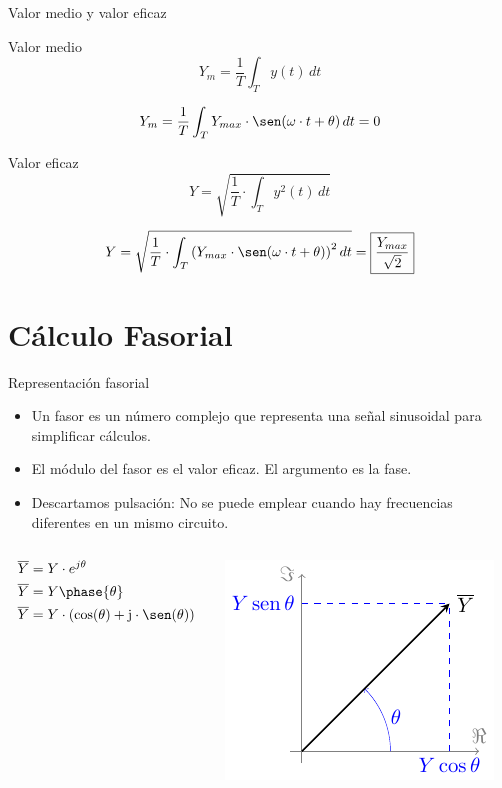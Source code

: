 \documentclass[aspectratio=169, usenames,svgnames,dvipsnames]{beamer}
\begin{document}
\begin{frame}[label={sec:orgc7bd73a}]{Valor medio y valor eficaz}
\begin{block}{Valor medio}
\[
Y_m=\frac{1}{T}\int_{T} y(t)\, dt
\]

\[
Y_m=\frac{1}{T}\int_T Y_{max}\cdot\sen(\omega \cdot t+\theta)\, dt=0
\]
\end{block}
\begin{block}{Valor eficaz}
\[
Y = \sqrt{\frac{1}{T}\cdot\int_T y^{2}(t)\, dt}
\]

\[
Y=\sqrt{\frac{1}{T}\cdot\int_T \left(Y_{max}\cdot\sen(\omega\cdot t+\theta)\right)^{2}dt}=\boxed{\frac{Y_{max}}{\sqrt{2}}}
\]
\end{block}
\end{frame}
\section{Cálculo Fasorial}
\label{sec:orge82ab2f}

\begin{frame}[label={sec:org8ac91a8}]{Representación fasorial}
\begin{itemize}
\item Un fasor es un \alert{número complejo} que representa una señal sinusoidal para simplificar cálculos.
\item El \alert{módulo} del fasor es el \alert{valor eficaz}. El \alert{argumento} es la \alert{fase}.
\item Descartamos pulsación: No se puede emplear cuando hay frecuencias diferentes en un mismo circuito.
\end{itemize}

\begin{columns}
\begin{column}{0.5\columnwidth}
\begin{align*}
\overline{Y} &= Y\cdot e^{j\theta}\\
\overline{Y} &= Y\phase{\theta}\\
\overline{Y} &= Y\cdot(\cos(\theta)+\mathrm{j}\cdot\sen(\theta))
\end{align*}
\end{column}

\begin{column}{0.5\columnwidth}
\begin{center}
\includegraphics[height=0.45\textheight]{../figs/fasor.pdf}
\end{center}
\end{column}
\end{columns}
\end{frame}
\end{document}
